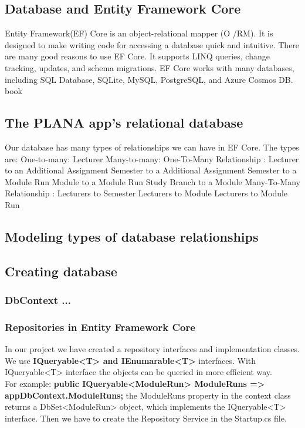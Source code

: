 \documentclass{scrartcl}
\begin{document}
\subsection{Database and Entity Framework Core}
Entity Framework(EF) Core is an object-relational mapper (O /RM). It is designed to make writing code for accessing a database quick and intuitive.
There are many good reasons to use EF Core. It supports LINQ queries, change tracking, updates, and schema migrations. EF Core works with many databases, including SQL Database, SQLite, MySQL, PostgreSQL, and Azure Cosmos DB.
book \cite{efa} \cite{ef}

\subsection{The PLANA app's relational database}
Our database has many types of relationships we can have in EF Core. The types are:
One-to-many: Lecturer
Many-to-many:
One-To-Many Relationship : 
Lecturer to an Additional Assignment 
Semester to a Additional Assignment
Semester to a Module Run 
Module to a Module Run
Study Branch to a Module
Many-To-Many Relationship :
Lecturers to Semester
Lecturers to Module
Lecturers to Module Run




\subsection{Modeling types of database relationships}

\subsection{Creating database}

\subsubsection{DbContext ...}
\subsubsection{Repositories in Entity Framework Core}
In our project we have created a repository interfaces and implementation classes.\\
We use \textbf{IQueryable<T> and IEnumarable<T>} interfaces.
With IQueryable<T> interface the objects can be queried in more efficient way.\\
For example: \textbf{public IQueryable<ModuleRun> ModuleRuns => appDbContext.ModuleRuns;} the ModuleRuns property in the context class returns a DbSet<ModuleRun> object, which implements the IQueryable<T> interface.
Then we have to  create the Repository Service in the Startup.cs file.\\
\end{document}
